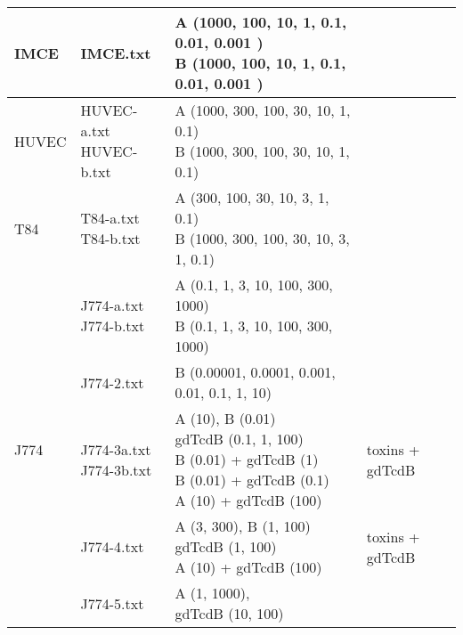 \begin{longtable}{ l l l l }
   IMCE & IMCE.txt & \specialcell{ A (1000, 100, 10, 1, 0.1, 0.01, 0.001 ) \\ 
                                         B (1000, 100, 10, 1, 0.1, 0.01, 0.001 )} &  \\ \hline
   HUVEC & \specialcell{HUVEC-a.txt\\ HUVEC-b.txt} &
           \specialcell{A (1000, 300, 100, 30, 10, 1, 0.1) \\
                        B (1000, 300, 100, 30, 10, 1, 0.1) } &  \\ \hline
   T84 & \specialcell{T84-a.txt \\ T84-b.txt } &
         \specialcell{A (300, 100, 30, 10, 3, 1, 0.1) \\
                      B (1000, 300, 100, 30, 10, 3, 1, 0.1) } &  \\ \hline
   \multirow{16}{*}{J774}  & \specialcell{ J774-a.txt \\ J774-b.txt} 
                          & \specialcell{ A (0.1, 1, 3, 10, 100, 300, 1000) \\
                                          B (0.1, 1, 3, 10, 100, 300, 1000) } & \\ \cline{2-4}
                          & J774-2.txt
                          & B (0.00001, 0.0001, 0.001, 0.01, 0.1, 1, 10) & \\ \cline{2-4}
                          & \specialcell{ J774-3a.txt \\ J774-3b.txt} 
                          & \specialcell{ A (10), B (0.01) \\
                                          gdTcdB (0.1, 1, 100) \\
                                          B (0.01) + gdTcdB (1) \\
                                          B (0.01) + gdTcdB (0.1) \\
                                          A (10) + gdTcdB (100) } & toxins + gdTcdB \\ \cline{2-4}
                          & J774-4.txt
                          & \specialcell{ A (3, 300), B (1, 100) \\
                                          gdTcdB (1, 100) \\
                                          A (10) + gdTcdB (100) } & toxins + gdTcdB \\ \cline{2-4}
                          & J774-5.txt
                          & \specialcell{ A (1, 1000), \\
                                          gdTcdB (10, 100) \\
}
\end{longtable}
